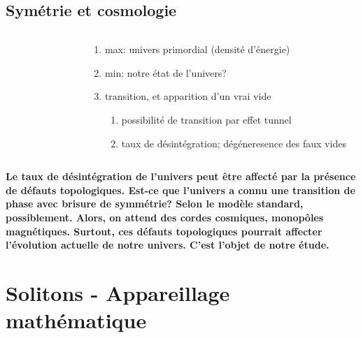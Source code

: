 \documentclass[handout]{beamer}
\begin{document}
\subsection{Symétrie et cosmologie}
\begin{frame}

\begin{columns}
    \begin{column}{.5\linewidth}
   \begin{figure}[0.3\textwidth]
    \end{figure}
    \end{column}
    \begin{column}{.5\linewidth}
    \begin{enumerate}
    \item max: univers primordial (densité d'énergie)
    \item min: notre état de l'univers?
    \item transition, et apparition d'un vrai vide
    \begin{enumerate}
    \item possibilité de transition par effet tunnel
    \item taux de désintégration; dégéneresence des faux vides
    \end{enumerate}
    \end{enumerate}
    \end{column}
  \end{columns}
  \end{frame}
  
  \begin{frame}
    
    \textbf{Le taux de désintégration de l'univers peut être affecté par la présence de défauts topologiques. Est-ce que l'univers a connu une transition de phase avec brisure de symmétrie? Selon le modèle standard, possiblement. Alors, on attend des cordes cosmiques, monopôles magnétiques. Surtout, ces défauts topologiques pourrait affecter l'évolution actuelle de notre univers. C'est l'objet de notre étude.}
    
  \end{frame}


\section{Solitons - Appareillage mathématique }
\end{document}
